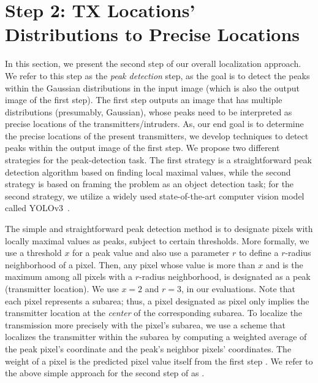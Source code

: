 \section{\our Step 2: TX Locations' Distributions to Precise Locations}
\label{sec:detect}

In this section, we present the second step of our overall localization approach. We refer to
this step as the {\em peak detection} step, as the goal is to detect the peaks within the 
Gaussian distributions in the input image (which is also the output image of the first step).
The first step outputs an image that has multiple distributions (presumably, Gaussian), whose
peaks need to be interpreted as precise locations of the transmitters/intruders.
As, our end goal is to determine the precise locations of the present transmitters, we develop techniques to detect peaks within the output image of the first step. 
We propose two different strategies for the peak-detection task. The first strategy is a straightforward peak detection algorithm based on finding local maximal values, while the 
second strategy is based on framing the problem as an object detection task; for the second strategy, we utilize a widely used state-of-the-art computer vision model called YOLOv3~\cite{yolov3}.

The simple and straightforward peak detection method is to designate pixels with
locally maximal values as peaks, subject to certain thresholds.
More formally, we use a threshold $x$ for a peak value and also use a parameter $r$ to define a $r$-radius neighborhood of a pixel. 
Then, any pixel whose value is more than $x$ and is the maximum among all pixels with a $r$-radius neighborhood, is designated as a peak (transmitter location). 
We use $x=2$ and $r=3$, in our evaluations.
Note that each pixel represents a subarea; thus, a pixel designated as pixel only 
implies the transmitter location at the {\em center} of the corresponding subarea.
To localize the transmission more precisely with the pixel's subarea, we use a scheme that localizes the transmitter within the subarea by computing a weighted average of the peak pixel's coordinate and the peak's neighbor pixels' coordinates.
The weight of a pixel is the predicted pixel value itself from the first step \imgimg.
We refer to the above simple approach for the second step of \our as \simpeak.

